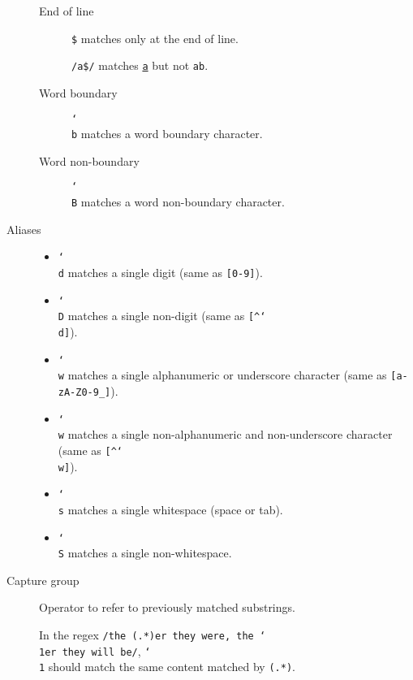 \begin{description}
\begin{description}
            \item[End of line] 
                \texttt{\$} matches only at the end of line.

                \begin{example}
                    \texttt{/a\$/} matches \texttt{\underline{a}} but not \texttt{ab}.
                \end{example}

            \item[Word boundary]
                \texttt{\char`\\ b} matches a word boundary character.

            \item[Word non-boundary] 
                \texttt{\char`\\ B} matches a word non-boundary character.
        \end{description}

    \item[Aliases] \phantom{}
        \begin{itemize}
            \item \texttt{\char`\\ d} matches a single digit (same as \texttt{[0-9]}).
            
            \item \texttt{\char`\\ D} matches a single non-digit (same as \texttt{[\textasciicircum\char`\\ d]}).
            
            \item \texttt{\char`\\ w} matches a single alphanumeric or underscore character (same as \texttt{[a-zA-Z0-9\_]}).
            
            \item \texttt{\char`\\ w} matches a single non-alphanumeric and non-underscore character (same as \texttt{[\textasciicircum\char`\\ w]}).

            \item \texttt{\char`\\ s} matches a single whitespace (space or tab).
            
            \item \texttt{\char`\\ S} matches a single non-whitespace.
        \end{itemize}


    \item[Capture group]
        Operator to refer to previously matched substrings.

        \begin{example}
            In the regex \texttt{/the (.*)er they were, the \char`\\ 1er they will be/}, \texttt{\char`\\ 1} should match the same content matched by \texttt{(.*)}.
        \end{example}
\end{description}



